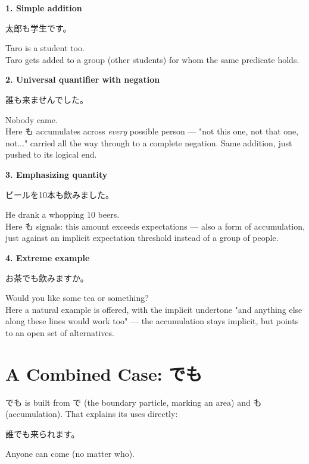 \documentclass[12pt]{book}
\begin{document}
\textbf{1. Simple addition}
\par\quad 太郎も学生です。\\
\par\quad Taro is a student too.\\

Taro gets added to a group (other students) for whom the same predicate holds.

\textbf{2. Universal quantifier with negation}
\par\quad 誰も来ませんでした。\\
\par\quad Nobody came.\\

Here も accumulates across \emph{every} possible person — "not this one, not that one, not..." carried all the way through to a complete negation. Same addition, just pushed to its logical end.

\textbf{3. Emphasizing quantity}
\par\quad ビールを10本も飲みました。\\
\par\quad He drank a whopping 10 beers.\\

Here も signals: this amount exceeds expectations — also a form of accumulation, just against an implicit expectation threshold instead of a group of people.

\textbf{4. Extreme example}
\par\quad お茶でも飲みますか。\\
\par\quad Would you like some tea or something?\\

Here a natural example is offered, with the implicit undertone "and anything else along these lines would work too" — the accumulation stays implicit, but points to an open set of alternatives.

\section*{A Combined Case: でも}

でも is built from で (the boundary particle, marking an area) and も (accumulation). That explains its uses directly:

\par\quad 誰でも来られます。\\
\par\quad Anyone can come (no matter who).\\
\end{document}
